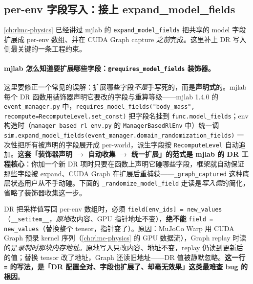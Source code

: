 \subsection{per-env 字段写入：接上 expand\_model\_fields}
\label{sec:rlmc-dr-inertia-expand}

\cref{ch:rlmc-physics} 已经讲过 mjlab 的 \verb|expand_model_fields| 把共享的 model 字段扩展成 per-env 数组、并在 CUDA Graph capture \emph{之前}完成。这里补上 DR 写入侧最关键的一条工程约束。

\paragraph{mjlab 怎么知道要扩展哪些字段：\texttt{@requires\_model\_fields} 装饰器。}这里要修正一个常见的误解：扩展哪些字段\emph{不是}手写死的，而是\textbf{声明式}的。mjlab 每个 DR 函数用装饰器声明它要改的字段与重算等级——mjlab 1.4.0 的 \verb|event_manager.py| 中，\verb|requires_model_fields("body_mass", recompute=RecomputeLevel.set_const)| 把字段名挂到 \verb|func.model_fields|；env 构造时（\verb|manager_based_rl_env.py| 的 \verb|ManagerBasedRlEnv| 中）统一调 \verb|sim.expand_model_fields(event_manager.domain_randomization_fields)| 一次性把所有被声明的字段展开成 per-world，派生字段按 \verb|RecomputeLevel| 自动追加。\textbf{这套「装饰器声明 $\to$ 自动收集 $\to$ 统一扩展」的范式是 mjlab 的 DR 工程核心}：你加一个新 DR 项时只要在函数上声明它碰哪些字段，框架就自动保证那些字段被 expand、CUDA Graph 在扩展后重捕获——\verb|_graph_captured| 这种底层状态用户从不手动碰。下面的 \verb|_randomize_model_field| 走读是\emph{写入侧}的简化，省略了装饰器收集这一步。

\begin{insight}\label{ins:rlmc-dr-inplace}
DR 把采样值写回 per-env 数组时，必须 \verb|field[env_ids] = new_values|（\verb|__setitem__|，\emph{原地}改内容、GPU 指针地址不变），\textbf{绝不能} \verb|field = new_values|（替换整个 tensor，指针变了）。原因：MuJoCo Warp 用 CUDA Graph 预录 kernel 序列（\cref{ch:rlmc-physics} 的 GPU 数据流），Graph replay 时读的是\emph{录制时那块内存地址}。原地写入只改内容、地址不变，replay 仍读到更新后的值；替换 tensor 改了地址，Graph 还读旧地址——DR 值被静默忽略。\textbf{这一行 \texttt{=} 的写法，是「DR 配置全对、字段也扩展了、却毫无效果」这类最难查 bug 的根因}。
\end{insight}

